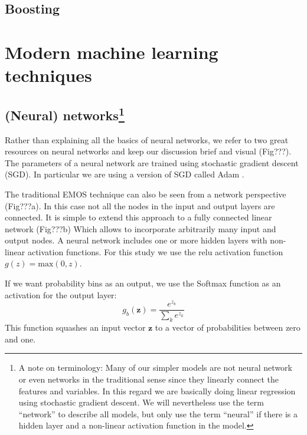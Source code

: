 \documentclass[a4paper,10pt]{scrartcl}
\begin{document}
\subsection{Boosting}

\section{Modern machine learning techniques}

\subsection{(Neural) networks\protect\footnote{A note on terminology: Many of our simpler models are not neural network or even networks in the traditional sense since they linearly connect the features and variables. In this regard we are basically doing linear regression using stochastic gradient descent. We will nevertheless use the term ``network'' to describe all models, but only use the term ``neural'' if there is a hidden layer and a non-linear activation function in the model.}}

Rather than explaining all the basics of neural networks, we refer to two great resources on neural networks \citep{Nielsen2015, Goodfellow2016} and keep our discussion brief and visual (Fig???). The parameters of a neural network are trained using stochastic gradient descent (SGD). In particular we are using a version of SGD called Adam \citep{???}.

The traditional EMOS technique can also be seen from a network perspective (Fig???a). In this case not all the nodes in the input and output layers are connected. It is simple to extend this approach to a fully connected linear network (Fig???b) Which allows to incorporate arbitrarily many input and output nodes. A neural network includes one or more hidden layers with non-linear activation functions. For this study we use the relu activation function $g(z) = \mathrm{max}(0, z)$.

If we want probability bins as an output, we use the Softmax function as an activation for the output layer: 
\begin{equation}
 g_b(\mathbf{z}) = \frac{e^{z_b}}{\sum_k e^{z_k}}
\end{equation}
This function squashes an input vector $\mathbf{z}$ to a vector of probabilities between zero and one.
\end{document}
